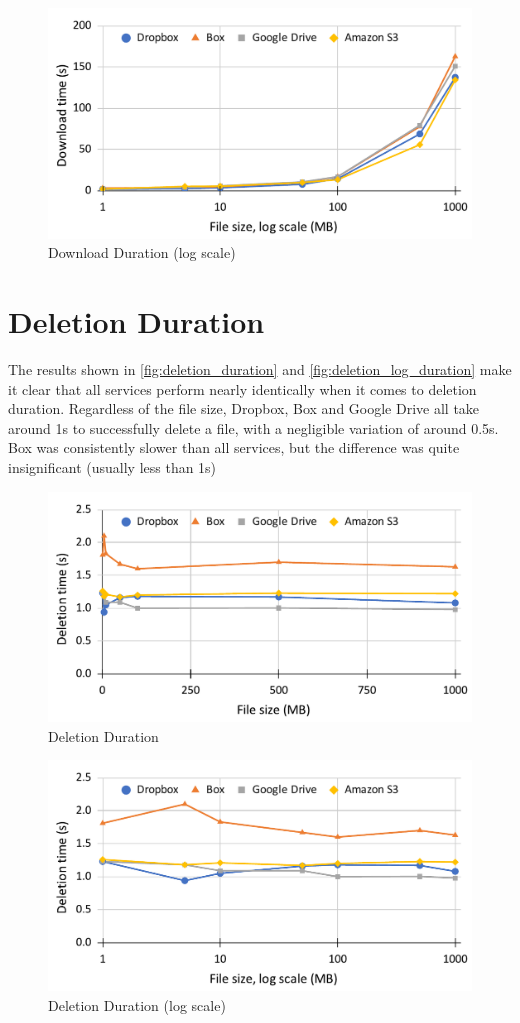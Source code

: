 \begin{figure} [!h]
    \centering
    \includegraphics[scale=0.6]{images/download_log_chart}
    \caption{\label{fig:download_log_duration}Download Duration (log scale)}
\end{figure}

\section{Deletion Duration}
The results shown in \autoref{fig:deletion_duration} and \autoref{fig:deletion_log_duration} make it clear that all services perform nearly identically when it comes to deletion duration. Regardless of the file size, Dropbox, Box and Google Drive all take around 1s to successfully delete a file, with a negligible variation of around 0.5s. Box was consistently slower than all services, but the difference was quite insignificant (usually less than 1s)

\begin{figure} [!h]
    \centering
    \includegraphics[scale=0.5]{images/deletion_chart}
    \caption{\label{fig:deletion_duration}Deletion Duration}
\end{figure}

\begin{figure} [!h]
    \centering
    \includegraphics[scale=0.5]{images/deletion_log_chart}
    \caption{\label{fig:deletion_log_duration}Deletion Duration (log scale)}
\end{figure}
